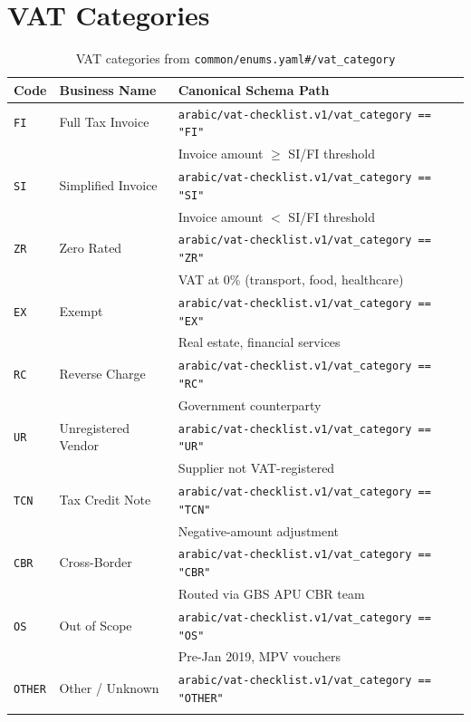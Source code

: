 \documentclass[11pt,a4paper]{report}
\newcommand{\schemapath}[1]{\texttt{\textcolor{pathcolor}{#1}}}
\newcommand{\enumval}[1]{\texttt{\textcolor{sapgreen}{#1}}}
\begin{document}
\section{VAT Categories}

\begin{longtable}{@{}p{1.5cm}p{3cm}p{7.5cm}@{}}
\toprule
\textbf{Code} & \textbf{Business Name} & \textbf{Canonical Schema Path} \\
\midrule
\endhead
\enumval{FI} & Full Tax Invoice & \schemapath{arabic/vat-checklist.v1/vat\_category == "FI"} \\
 & & \footnotesize Invoice amount $\geq$ SI/FI threshold \\[3pt]
\enumval{SI} & Simplified Invoice & \schemapath{arabic/vat-checklist.v1/vat\_category == "SI"} \\
 & & \footnotesize Invoice amount $<$ SI/FI threshold \\[3pt]
\enumval{ZR} & Zero Rated & \schemapath{arabic/vat-checklist.v1/vat\_category == "ZR"} \\
 & & \footnotesize VAT at 0\% (transport, food, healthcare) \\[3pt]
\enumval{EX} & Exempt & \schemapath{arabic/vat-checklist.v1/vat\_category == "EX"} \\
 & & \footnotesize Real estate, financial services \\[3pt]
\enumval{RC} & Reverse Charge & \schemapath{arabic/vat-checklist.v1/vat\_category == "RC"} \\
 & & \footnotesize Government counterparty \\[3pt]
\enumval{UR} & Unregistered Vendor & \schemapath{arabic/vat-checklist.v1/vat\_category == "UR"} \\
 & & \footnotesize Supplier not VAT-registered \\[3pt]
\enumval{TCN} & Tax Credit Note & \schemapath{arabic/vat-checklist.v1/vat\_category == "TCN"} \\
 & & \footnotesize Negative-amount adjustment \\[3pt]
\enumval{CBR} & Cross-Border & \schemapath{arabic/vat-checklist.v1/vat\_category == "CBR"} \\
 & & \footnotesize Routed via GBS APU CBR team \\[3pt]
\enumval{OS} & Out of Scope & \schemapath{arabic/vat-checklist.v1/vat\_category == "OS"} \\
 & & \footnotesize Pre-Jan 2019, MPV vouchers \\[3pt]
\enumval{OTHER} & Other / Unknown & \schemapath{arabic/vat-checklist.v1/vat\_category == "OTHER"} \\
\bottomrule
\caption{VAT categories from \schemapath{common/enums.yaml\#/vat\_category}}
\end{longtable}
\end{document}
